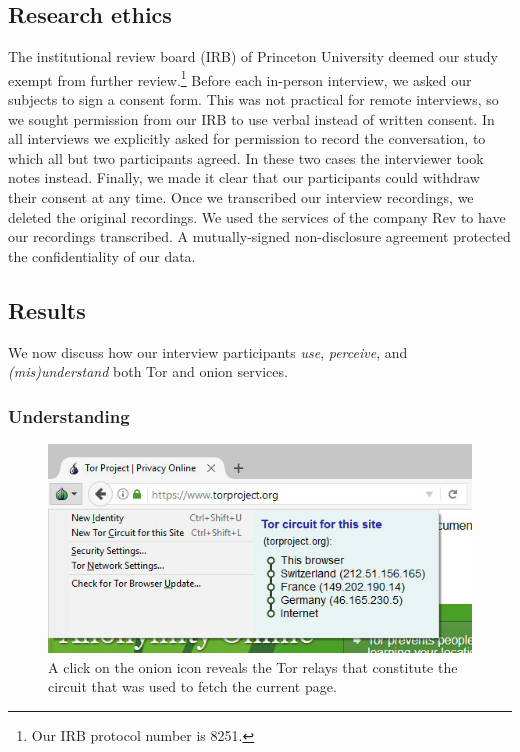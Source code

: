 \subsection{Research ethics}

The institutional review board (IRB) of Princeton University deemed our study
exempt from further review.\footnote{Our IRB protocol number is 8251.}  Before
each in-person interview, we asked our subjects to sign a consent form.  This
was not practical for remote interviews, so we sought permission from our IRB
to use verbal instead of written consent.  In all interviews we explicitly
asked for permission to record the conversation, to which all but two
participants agreed.  In these two cases the interviewer took notes instead.
Finally, we made it clear that our participants could withdraw their consent at
any time.  Once we transcribed our interview recordings, we deleted the
original recordings.  We used the services of the company Rev to have our
recordings transcribed.  A mutually-signed non-disclosure agreement protected
the confidentiality of our data.

\subsection{Results}

We now discuss how our interview participants \emph{use}, \emph{perceive}, and
\emph{(mis)understand} both Tor and onion services.

\subsubsection{Understanding}

\begin{figure}[t]
    \centering
    \includegraphics[width=\linewidth]{figures/tor-button-screenshot.jpg}
    \caption{A click on the onion icon reveals the Tor relays that constitute
    the circuit that was used to fetch the current page.}
    \label{fig:tor-button}
\end{figure}

